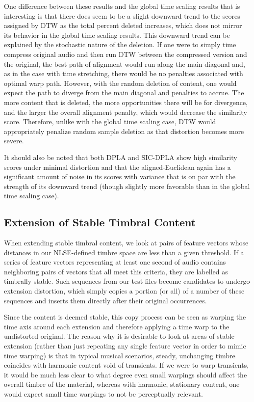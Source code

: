 \documentclass[a4paper,12pt]{report} 	%
\numberwithin{figure}{chapter}
\numberwithin{table}{chapter}
\numberwithin{equation}{chapter}
\begin{document}
\begin{flushleft}
One difference between these results and the global time scaling results that is interesting is that there does seem to be a slight downward trend to the scores assigned by DTW as the total percent deleted increases, which does not mirror its behavior in the global time scaling results. This downward trend can be explained by the stochastic nature of the deletion. If one were to simply time compress original audio and then run DTW between the compressed version and the original, the best path of alignment would run along the main diagonal and, as in the case with time stretching, there would be no penalties associated with optimal warp path. However, with the random deletion of content, one would expect the path to diverge from the main diagonal and penalties to accrue. The more content that is deleted, the more opportunities there will be for divergence, and the larger the overall alignment penalty, which would decrease the similarity score. Therefore, unlike with the global time scaling case, DTW would appropriately penalize random sample deletion as that distortion becomes more severe.

It should also be noted that both DPLA and SIC-DPLA show high similarity scores under minimal distortion and that the aligned-Euclidean again has a significant amount of noise in its scores with variance that is on par with the strength of its downward trend (though slightly more favorable than in the global time scaling case).

\subsection{Extension of Stable Timbral Content}
When extending stable timbral content, we look at pairs of feature vectors whose distances in our NLSE-defined timbre space are less than a given threshold. If a series of feature vectors representing at least one second of audio contains neighboring pairs of vectors that all meet this criteria, they are labelled as timbrally stable. Such sequences from our test files become candidates to undergo extension distortion, which simply copies a portion (or all) of a number of these sequences and inserts them directly after their original occurrences.

Since the content is deemed stable, this copy process can be seen as warping the time axis around each extension and therefore applying a time warp to the undistorted original. The reason why it is desirable to look at areas of stable extension (rather than just repeating any single feature vector in order to mimic time warping) is that in typical musical scenarios, steady, unchanging timbre coincides with harmonic content void of transients. If we were to warp transients, it would be much less clear to what degree even small warpings should affect the overall timbre of the material, whereas with harmonic, stationary content, one would expect small time warpings to not be perceptually relevant.


\end{flushleft}
\end{document}
